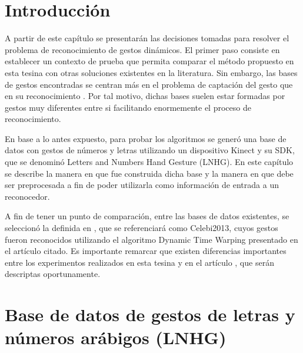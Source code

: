 

\section{Introducción}


A partir de este capítulo se presentarán las decisiones tomadas para resolver el problema de reconocimiento de gestos dinámicos.
El primer paso consiste en establecer un contexto de prueba que permita comparar el método propuesto en esta tesina con otras soluciones existentes en la literatura. Sin embargo, las bases de gestos encontradas se centran más en el problema de captación del gesto que en su reconocimiento \cite{Moni2009,Arpita2013,chaudhary2013}. Por tal motivo, dichas bases suelen estar formadas por gestos muy diferentes entre si facilitando enormemente el proceso de reconocimiento.

En base a lo antes expuesto, para probar los algoritmos se generó una base de datos con gestos de números y letras utilizando un dispositivo Kinect y su SDK, que se denominó Letters and Numbers Hand Gesture (LNHG). En este capítulo se describe la manera en que fue construida dicha base y la manera en que debe ser preprocesada a fin de poder utilizarla como información de entrada a un reconocedor.

A fin de tener un punto de comparación, entre las bases de datos existentes, se seleccionó la definida en \cite{celebi2013}, que se referenciará como Celebi2013, cuyos gestos fueron reconocidos utilizando el algoritmo Dynamic Time Warping presentado en el artículo citado. Es importante remarcar que existen diferencias importantes entre los experimentos realizados en esta tesina y en el artículo \cite{celebi2013}, que serán descriptas oportunamente.


%

%


\section{Base de datos de gestos de letras y números arábigos (LNHG)}

